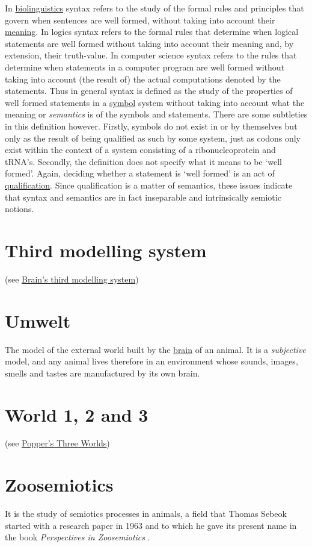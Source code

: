 \documentclass[12pt]{article}
\begin{document}
In \hyperlink{biolinguistics}{biolinguistics} syntax refers to the
study of the formal rules and principles that govern when sentences
are well formed, without taking into account their \hyperlink{meaning}{meaning}. In logics
syntax refers to the formal rules that determine when logical
statements are well formed without taking into account their meaning
and, by extension, their truth-value.  In computer science syntax
refers to the rules that determine when statements in a computer
program are well formed without taking into account (the result of)
the actual computations denoted by the statements. Thus in general
syntax is defined as the study of the properties of well formed
statements in a \hyperlink{icons_indexes_and_symbols}{symbol} system without taking into account what the
meaning or \textit{semantics} is of the symbols and statements.  There are some
subtleties in this definition however. Firstly, symbols do not exist
in or by themselves but only as the result of being qualified as such
by some system, just as codons only exist within the context of a
system consisting of a ribonucleoprotein and tRNA's. Secondly, the
definition does not specify what it means to be `well formed'. Again,
deciding whether a statement is `well formed' is an act of
\hyperlink{qualification}{qualification}. Since qualification is a
matter of semantics, these issues indicate that syntax and semantics
are in fact inseparable and intrinsically semiotic notions.

\hypertarget{third_modelling_system}{}
\section{Third modelling system} (see \hyperlink{brains_third_modelling_system}{Brain's third modelling system})


\hypertarget{umwelt}{}
\section{Umwelt}
The model of the external world built by the \hyperlink{brain}{brain} of an animal. It is a \textit{subjective} model, and any animal lives therefore in an environment whose sounds, images, smells and tastes are manufactured by its own brain.


\hypertarget{world_1_2_and_3}{}
\section{World 1, 2 and 3} (see \hyperlink{poppers_three_worlds}{Popper's Three Worlds})


\hypertarget{zoosemiotics}{}
\section{Zoosemiotics}
It is the study of semiotics processes in animals, a field that Thomas Sebeok started with a research paper in 1963 and to which he gave its present name in the book \textit{Perspectives in Zoosemiotics} \cite{sebeok72:_persp_zoosem}. 
 



\end{document}
